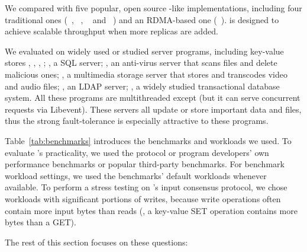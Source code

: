 

We compared \xxx with five popular, open source \paxos-like implementations,
including four traditional ones (\libpaxos~\cite{libpaxos},
\zookeeper~\cite{zookeeper}, \crane~\cite{crane:sosp15} and
\spaxos~\cite{spaxos:srds12}) and an RDMA-based one (\dare~\cite{dare:hpdc15}). 
\spaxos is designed to achieve scalable throughput when more replicas are 
added. 

We evaluated \xxx on \nprog widely used or studied server programs, including
\nkvprog key-value stores \redis, \memcached, \ssdb, \mongodb; \mysql, a SQL
server; \clamav, an anti-virus server that scans files and delete malicious ones;
\mediatomb, a multimedia storage server that stores and transcodes video and
audio files; \openldap, an LDAP server; \calvin, a widely studied transactional
database system. All these programs are multithreaded except \redis (but it can 
serve concurrent requests via Libevent). These servers all update or store 
important data and files, thus the strong \paxos fault-tolerance is especially 
attractive to these programs.

Table~\ref{tab:benchmarks} introduces the benchmarks and workloads we used. To
evaluate \xxx's practicality, we used the protocol or program developers' own 
performance benchmarks or popular third-party benchmarks. For benchmark 
workload settings, we used the benchmarks' default workloads whenever 
available. To perform a stress testing on \xxx's input consensus protocol, we 
chose workloads with significant portions of writes, because write operations 
often contain more input bytes than reads (\eg, a key-value SET operation 
contains more bytes than a GET).



The rest of this section focuses on these questions:


